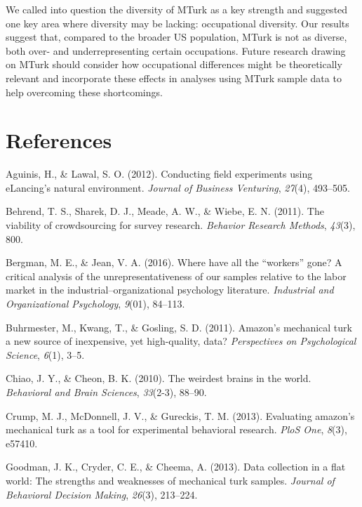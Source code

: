 \documentclass[english,man]{apa6}
\theoremstyle{definition}
\theoremstyle{definition}
\theoremstyle{remark}
\begin{document}
We called into question the diversity of MTurk as a key strength and
suggested one key area where diversity may be lacking: occupational
diversity. Our results suggest that, compared to the broader US
population, MTurk is not as diverse, both over- and underrepresenting
certain occupations. Future research drawing on MTurk should consider
how occupational differences might be theoretically relevant and
incorporate these effects in analyses using MTurk sample data to help
overcoming these shortcomings.

\newpage

\section{References}\label{references}

\setlength{\parindent}{-0.5in} \setlength{\leftskip}{0.5in}

\hypertarget{refs}{}
\hypertarget{ref-aguinis2012conducting}{}
Aguinis, H., \& Lawal, S. O. (2012). Conducting field experiments using
eLancing's natural environment. \emph{Journal of Business Venturing},
\emph{27}(4), 493--505.

\hypertarget{ref-behrend2011viability}{}
Behrend, T. S., Sharek, D. J., Meade, A. W., \& Wiebe, E. N. (2011). The
viability of crowdsourcing for survey research. \emph{Behavior Research
Methods}, \emph{43}(3), 800.

\hypertarget{ref-bergman2016have}{}
Bergman, M. E., \& Jean, V. A. (2016). Where have all the ``workers''
gone? A critical analysis of the unrepresentativeness of our samples
relative to the labor market in the industrial--organizational
psychology literature. \emph{Industrial and Organizational Psychology},
\emph{9}(01), 84--113.

\hypertarget{ref-buhrmester2011amazon}{}
Buhrmester, M., Kwang, T., \& Gosling, S. D. (2011). Amazon's mechanical
turk a new source of inexpensive, yet high-quality, data?
\emph{Perspectives on Psychological Science}, \emph{6}(1), 3--5.

\hypertarget{ref-chiao2010weirdest}{}
Chiao, J. Y., \& Cheon, B. K. (2010). The weirdest brains in the world.
\emph{Behavioral and Brain Sciences}, \emph{33}(2-3), 88--90.

\hypertarget{ref-crump2013evaluating}{}
Crump, M. J., McDonnell, J. V., \& Gureckis, T. M. (2013). Evaluating
amazon's mechanical turk as a tool for experimental behavioral research.
\emph{PloS One}, \emph{8}(3), e57410.

\hypertarget{ref-goodman2013data}{}
Goodman, J. K., Cryder, C. E., \& Cheema, A. (2013). Data collection in
a flat world: The strengths and weaknesses of mechanical turk samples.
\emph{Journal of Behavioral Decision Making}, \emph{26}(3), 213--224.
\end{document}
